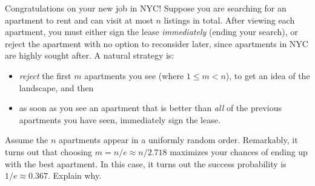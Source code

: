 \begin{question}
  Congratulations on your new job in NYC! Suppose you are searching for an apartment to rent and can visit at most $n$ listings in total. After viewing each apartment, you must either sign the lease \emph{immediately} (ending your search), or reject the apartment with no option to reconsider later, since apartments in NYC are highly sought after.
  A natural strategy is:
  \begin{itemize}
    \item[(i)] \emph{reject} the first $m$ apartments you see  (where $1\leq m < n$), to get an idea of the landscape, and then
    \item[(ii)] as soon as you see an apartment that is better than \emph{all} of the previous apartments you have seen, immediately sign the lease.
  \end{itemize}
  Assume the $n$ apartments appear in a uniformly random order. Remarkably, it turns out that choosing $m = n/e \approx n/2.718$ maximizes your chances of ending up with the best apartment. In this case, it turns out the success probability is $1/e \approx 0.367$. Explain why.

\end{question}
